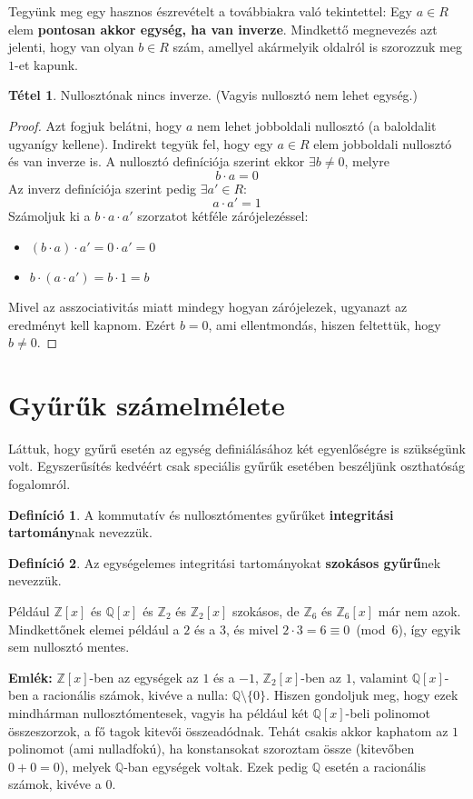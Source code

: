 \documentclass[12pt]{book}
\theoremstyle{plain} %
\theoremstyle{definition} %
\newtheorem{defi/}{Definíció}[section]
\newenvironment{defi}
  {\renewcommand{\qedsymbol}{$\clubsuit$}%
   \pushQED{\qed}\begin{defi/}}
  {\popQED\end{defi/}}
\newtheorem{theo/}{Tétel}[section]
\newenvironment{theo}
  {\renewcommand{\qedsymbol}{$\clubsuit$}%
   \pushQED{\qed}\begin{theo/}}
  {\popQED\end{theo/}}
\theoremstyle{remark}
\renewcommand\qedsymbol{$\blacksquare$}
\numberwithin{equation}{section}  %
\begin{document}
	Tegyünk meg egy hasznos észrevételt a továbbiakra való tekintettel: Egy $a\in R$ elem \textbf{pontosan akkor egység, ha van inverze}. Mindkettő megnevezés azt jelenti, hogy van olyan $b\in R$ szám, amellyel akármelyik oldalról is szorozzuk meg $1$-et kapunk.
	\begin{theo}
		Nullosztónak nincs inverze. (Vagyis nullosztó nem lehet egység.)
	\end{theo}
	\begin{proof}
		Azt fogjuk belátni, hogy $a$ nem lehet jobboldali nullosztó (a baloldalit ugyanígy kellene). Indirekt tegyük fel, hogy egy $a\in R$ elem jobboldali nullosztó és van inverze is. A nullosztó definíciója szerint ekkor $\exists b\neq 0$, melyre
		\[ b\cdot a = 0 \]
		Az inverz definíciója szerint pedig $\exists a'\in R\colon$
		\[ a\cdot a' = 1 \]
		Számoljuk ki a $b\cdot a \cdot a'$ szorzatot kétféle zárójelezéssel:
		\begin{itemize}
			\item $(b\cdot a) \cdot a' = 0\cdot a' = 0$
			\item $b\cdot (a\cdot a') = b\cdot 1 = b$
		\end{itemize}
		Mivel az asszociativitás miatt mindegy hogyan zárójelezek, ugyanazt az eredményt kell kapnom. Ezért $b=0$, ami ellentmondás, hiszen feltettük, hogy $b\neq 0$.
	\end{proof}
	
	\section{Gyűrűk számelmélete}
	Láttuk, hogy gyűrű esetén az egység definiálásához két egyenlőségre is szükségünk volt. Egyszerűsítés kedvéért csak speciális gyűrűk esetében beszéljünk oszthatóság fogalomról.
	\begin{defi}
		A kommutatív és nullosztómentes gyűrűket \textbf{integritási tartomány}nak nevezzük.
	\end{defi}
	\begin{defi}
		Az egységelemes integritási tartományokat \textbf{szokásos gyűrű}nek nevezzük.
	\end{defi}
	Például $\mathbb{Z}[x]$ és $\mathbb{Q}[x]$ és $\mathbb{Z}_2$ és $\mathbb{Z}_2[x]$ szokásos, de $\mathbb{Z}_6$ és $\mathbb{Z}_6[x]$ már nem azok. Mindkettőnek elemei például a $2$ és a $3$, és mivel $2\cdot 3 = 6 \equiv 0$~(mod~6), így egyik sem nullosztó mentes.
	
	\textbf{Emlék: }$\mathbb{Z}[x]$-ben az egységek az $1$ és a $-1$, $\mathbb{Z}_2[x]$-ben az $1$, valamint $\mathbb{Q}[x]$-ben a racionális számok, kivéve a nulla: $\mathbb{Q}\setminus \{0\}$. Hiszen gondoljuk meg, hogy ezek mindhárman nullosztómentesek, vagyis ha például két $\mathbb{Q}[x]$-beli polinomot összeszorzok, a fő tagok kitevői összeadódnak. Tehát csakis akkor kaphatom az $1$ polinomot (ami nulladfokú), ha konstansokat szoroztam össze (kitevőben $0+0=0$), melyek $\mathbb{Q}$-ban egységek voltak. Ezek pedig $\mathbb{Q}$ esetén a racionális számok, kivéve a $0$.
	
\end{document}
